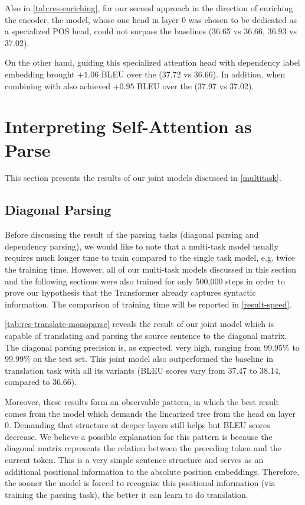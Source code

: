 Also in \cref{tab:res-enriching}, for our second approach in the direction of enriching the encoder, the \SpecPOS model, whose one head in layer 0 was chosen to be dedicated as a specialized POS head, could not surpass the baselines (36.65 vs 36.66, 36.93 vs 37.02).

On the other hand, guiding this specialized attention head with dependency label embedding brought $+1.06$ BLEU over the \transformerbase (37.72 vs 36.66).
In addition, \SpecDep when combining with \transformerrel also achieved $+0.95$ BLEU over the \transformerrel (37.97 vs 37.02).

\section{Interpreting Self-Attention as Parse}
\label{result-promote}

This section presents the results of our joint models discussed in \cref{multitask}.

\subsection{Diagonal Parsing}
\label{result-promote-diagonal}

Before discussing the result of the parsing tasks (diagonal parsing and dependency parsing), we would like to note that a multi-task model usually requires much longer time to train compared to the single task model, e.g. twice the training time.
However, all of our multi-task models discussed in this section and the following sections were also trained for only 500,000 steps in order to prove our hypothesis that the Transformer already captures syntactic information.
The comparison of training time will be reported in \cref{result-speed}.

\cref{tab:res-translate-monoparse} reveals the result of our joint model which is capable of translating and parsing the source sentence to the diagonal matrix.
The diagonal parsing precision is, as expected, very high, ranging from 99.95\% to 99.99\% on the test set.
This joint model also outperformed the baseline in translation task with all its variants (BLEU scores vary from 37.47 to 38.14, compared to 36.66).

Moreover, these results form an observable pattern, in which the best result comes from the model which demands the linearized tree from the head on layer 0.
Demanding that structure at deeper layers still helps but BLEU scores decrease.
We believe a possible explanation for this pattern is because the diagonal matrix represents the relation between the preceding token and the current token.
This is a very simple sentence structure and serves as an additional positional information to the absolute position embeddings.
Therefore, the sooner the model is forced to recognize this positional information (via training the parsing task), the better it can learn to do translation.

